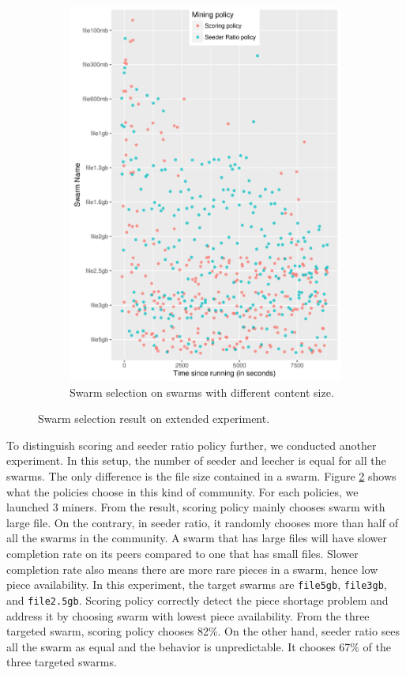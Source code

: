 \begin{figure}[tb]
\begin{adjustwidth}{-1.5cm}{}
\begin{subfigure}[t]{0.6\textwidth}
			\includegraphics[width=\textwidth]{pics/results/scmulti_scatter.pdf}
			\caption{Swarm selection on swarms with different content size.}
			\label{fig:scatterscmulti}
		\end{subfigure}
		\caption{Swarm selection result on extended experiment.}
	\end{adjustwidth}
\end{figure}

To distinguish scoring and seeder ratio policy further, we conducted another experiment. In this setup, the number of seeder and leecher is equal for all the swarms. The only difference is the file size contained in a swarm. Figure \ref{fig:scatterscmulti} shows what the policies choose in this kind of community. For each policies, we launched 3 miners. From the result, scoring policy mainly chooses swarm with large file. On the contrary, in seeder ratio, it randomly chooses more than half of all the swarms in the community. A swarm that has large files will have slower completion rate on its peers compared to one that has small files. Slower completion rate also means there are more rare pieces in a swarm, hence low piece availability. In this experiment, the target swarms are \texttt{file5gb}, \texttt{file3gb}, and \texttt{file2.5gb}. Scoring policy correctly detect the piece shortage problem and address it by choosing swarm with lowest piece availability. From the three targeted swarm, scoring policy chooses 82\%. On the other hand, seeder ratio sees all the swarm as equal and the behavior is unpredictable. It chooses 67\% of the three targeted swarms.

